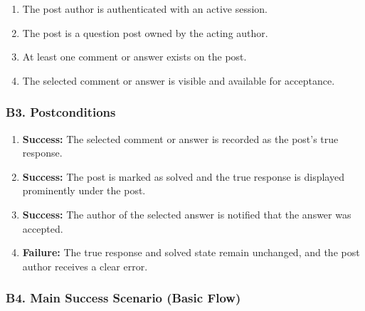 \documentclass[12pt]{article}
\begin{document}
\begin{enumerate}
\item The post author is authenticated with an active session.
\item The post is a question post owned by the acting author.
\item At least one comment or answer exists on the post.
\item The selected comment or answer is visible and available for acceptance.
\end{enumerate}
\par\medskip

\hypertarget{sec:b3-postconditions}{}
\subsubsection*{B3. Postconditions}
\par\medskip

\begin{enumerate}
\item \textbf{Success:} The selected comment or answer is recorded as the post's true response.
\item \textbf{Success:} The post is marked as solved and the true response is displayed prominently under the post.
\item \textbf{Success:} The author of the selected answer is notified that the answer was accepted.
\item \textbf{Failure:} The true response and solved state remain unchanged, and the post author receives a clear error.
\end{enumerate}
\par\medskip

\hypertarget{sec:b4-main-success-scenario-basic-flow}{}
\subsubsection*{B4. Main Success Scenario (Basic Flow)}
\par\medskip
\end{document}
